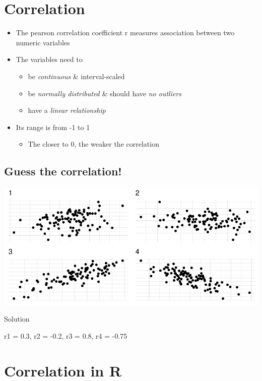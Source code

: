 \documentclass[
]{book}
\providecommand{\tightlist}{%
  \setlength{\itemsep}{0pt}\setlength{\parskip}{0pt}}
\begin{document}
\section{Correlation}\label{correlation}

\begin{itemize}
\tightlist
\item
  The pearson correlation coefficient r measures association between two numeric variables
\item
  The variables need to

  \begin{itemize}
  \tightlist
  \item
    be \emph{continuous} \& interval-scaled
  \item
    be \emph{normally distributed} \& should have \emph{no outliers}
  \item
    have a \emph{linear relationship}
  \end{itemize}
\item
  Its range is from -1 to 1

  \begin{itemize}
  \tightlist
  \item
    The closer to 0, the weaker the correlation
  \end{itemize}
\end{itemize}

\subsection{Guess the correlation!}\label{guess-the-correlation}

\includegraphics{_main_files/figure-html/corr1-1.pdf}

Solution

r1 = 0.3, r2 = -0.2, r3 = 0.8, r4 = -0.75

\section{Correlation in R}\label{correlation-in-r}
\end{document}
